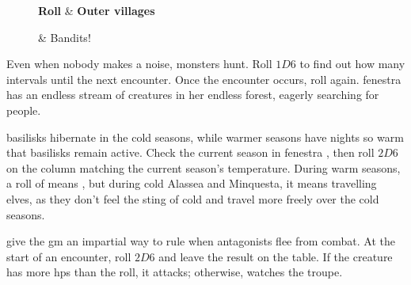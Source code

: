 \begin{multicols}{2}
\begin{figure*}[b!]
\begin{multicols}{3}
\setcounter{enc}{15}
\setcounter{diceNo}{13}
\vspace{2em}
\noindent
\begin{boxtable}[c|L]
  \hline
  \hline
  \textbf{Roll} & \textbf{Outer \Glspl{village}} \\
  \hline
  \hline
  \addtocounter{diceNo}{-1}
  \addtocounter{enc}{-1}
   & Bandits! \\
  \hline
  \hline
\end{boxtable}

\end{multicols}

\end{figure*}

\noindent
Even when nobody makes a noise, \glspl{monster} hunt.
Roll $1D6$ to find out how many \glspl{interval} until the next encounter.
Once the encounter occurs, roll again.
\Gls{fenestra} has an endless stream of creatures in her endless forest, eagerly searching for people.

\Glspl{basilisk} hibernate in the cold seasons, while warmer seasons have nights so warm that \glspl{basilisk} remain active.
Check the current season in \gls{fenestra} , then roll $2D6$ on the column matching the current season's temperature.
During warm seasons, a roll of   means , but during cold \gls{Alassea} and \gls{Minquesta}, it means travelling elves, as they don't feel the sting of cold%
and travel more freely over the cold seasons.

give the \gls{gm} an impartial way to rule when antagonists flee from combat.
At the start of an encounter, roll $2D6$ and leave the result on the table.
If the creature has more \glspl{hp} than the roll, it attacks; otherwise, watches the troupe.



\end{multicols}
